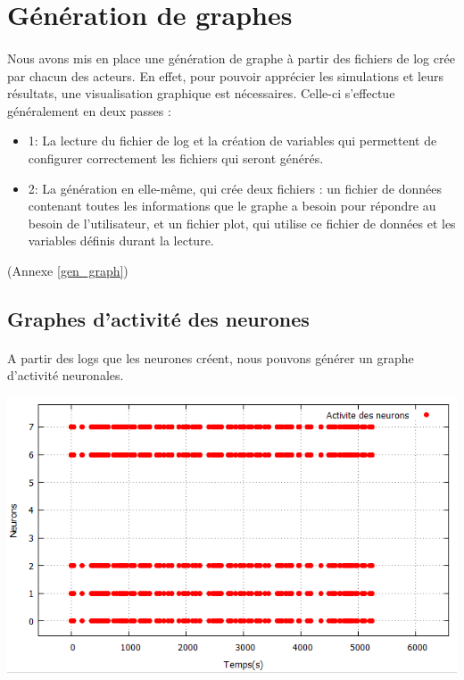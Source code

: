\documentclass[a4paper,10pt]{article}
\begin{document}
\subsection{}

\newpage

\section{Génération de graphes}

\paragraph{}
Nous avons mis en place une génération de graphe à partir des fichiers de log crée par chacun des acteurs. En effet, pour pouvoir apprécier les simulations et leurs résultats, une visualisation graphique est nécessaires.
Celle-ci s'effectue généralement en deux passes : 
\begin{itemize}
	\item{1}: La lecture du fichier de log et la création de variables qui permettent de configurer correctement les fichiers qui seront générés.
	\item{2}: La génération en elle-même, qui crée deux fichiers : un fichier de données contenant toutes les informations que le graphe a besoin pour répondre au besoin de l'utilisateur, et un fichier plot, qui utilise ce fichier de données et les variables définis durant la lecture.
\end{itemize}
(Annexe \ref{gen_graph})

\subsection{Graphes d’activité des neurones}
\paragraph{}
A partir des logs que les neurones créent, nous pouvons générer un graphe d’activité neuronales. 

\includegraphics[scale=0.95,right]{image/neuronActivity.png}
\end{document}
